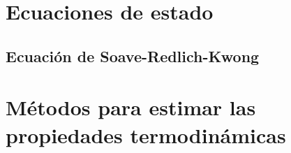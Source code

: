 \section{Ecuaciones de estado}
    \subsection{Ecuación de Soave-Redlich-Kwong}
        

\section{Métodos para estimar las propiedades termodinámicas}

    \subsection{}